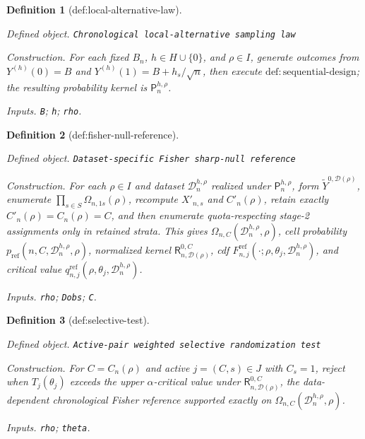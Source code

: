 \documentclass{article}
\newtheorem{definition}{Definition}
\begin{document}
\begin{definition}[def:local-alternative-law]\label{def:local-alternative-law}
\par\smallskip\noindent\emph{Defined object.} \texttt{Chronological local-\allowbreak{}alternative sampling law}
\par\smallskip\noindent\emph{Construction.} For each fixed \(B_n\), \(h\in H\cup\{0\}\), and \(\rho\in I\), generate outcomes from \(Y^{(h)}(0)=B\) and \(Y^{(h)}(1)=B+h_s/\sqrt n\), then execute \(\mathrm{def{:}sequential\mbox{-}design}\); the resulting probability kernel is \(\mathsf P_n^{h,\rho}\).
\par\smallskip\noindent\emph{Inputs.} \texttt{B}; \texttt{h}; \texttt{rho}.
\end{definition}

\begin{definition}[def:fisher-null-reference]\label{def:fisher-null-reference}
\par\smallskip\noindent\emph{Defined object.} \texttt{Dataset-\allowbreak{}specific Fisher sharp-\allowbreak{}null reference}
\par\smallskip\noindent\emph{Construction.} For each \(\rho\in I\) and dataset \(\mathcal D_n^{h,\rho}\) realized under \(\mathsf P_n^{h,\rho}\), form \(\widetilde Y^{0,\mathcal D(\rho)}\), enumerate \(\prod_{s\in S}\Omega_{n,1s}(\rho)\), recompute \(X'_{n,s}\) and \(C'_n(\rho)\), retain exactly \(C'_n(\rho)=C_n(\rho)=C\), and then enumerate quota-respecting stage-2 assignments only in retained strata. This gives \(\Omega_{n,C}(\mathcal D_n^{h,\rho},\rho)\), cell probability \(p_{\mathrm{ref}}(n,C,\mathcal D_n^{h,\rho},\rho)\), normalized kernel \(\mathsf R_{n,\mathcal D(\rho)}^{0,C}\), cdf \(F^{\mathrm{ref}}_{n,j}(\cdot;\rho,\theta_j,\mathcal D_n^{h,\rho})\), and critical value \(q^{\mathrm{ref}}_{n,j}(\rho,\theta_j,\mathcal D_n^{h,\rho})\).
\par\smallskip\noindent\emph{Inputs.} \texttt{rho}; \texttt{Dobs}; \texttt{C}.
\end{definition}

\begin{definition}[def:selective-test]\label{def:selective-test}
\par\smallskip\noindent\emph{Defined object.} \texttt{Active-\allowbreak{}pair weighted selective randomization test}
\par\smallskip\noindent\emph{Construction.} For \(C=C_n(\rho)\) and active \(j=(C,s)\in J\) with \(C_s=1\), reject when \(T_j(\theta_j)\) exceeds the upper \(\alpha\)-critical value under \(\mathsf R_{n,\mathcal D(\rho)}^{0,C}\), the data-dependent chronological Fisher reference supported exactly on \(\Omega_{n,C}(\mathcal D_n^{h,\rho},\rho)\).
\par\smallskip\noindent\emph{Inputs.} \texttt{rho}; \texttt{theta}.
\end{definition}
\end{document}
